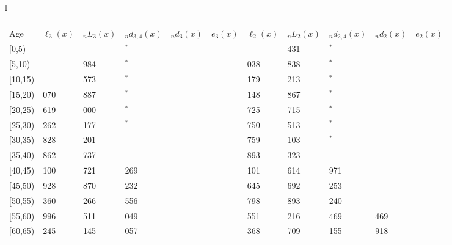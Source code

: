 \documentclass[
]{article}
\begin{document}
\begin{table}
\begin{tabular}[t]{l}
\end{tabular}
\centering
\begin{tabular}[t]{l}
\hline
\begin{tabular}{>{\raggedright\arraybackslash}p{.43in}>{\raggedleft\arraybackslash}p{.42in}>{\raggedleft\arraybackslash}p{.42in}>{\raggedleft\arraybackslash}p{.42in}>{\raggedleft\arraybackslash}p{.42in}>{\raggedleft\arraybackslash}p{.42in}>{\raggedleft\arraybackslash}p{.42in}>{\raggedleft\arraybackslash}p{.42in}>{\raggedleft\arraybackslash}p{.42in}>{\raggedleft\arraybackslash}p{.42in}>{\raggedleft\arraybackslash}p{.42in}}
\toprule
\multicolumn{1}{c}{ } & \multicolumn{5}{c}{(2) Lost mother only} & \multicolumn{5}{c}{(3) Lost father only} \\
\cmidrule(l{3pt}r{3pt}){2-6} \cmidrule(l{3pt}r{3pt}){7-11}
Age & $\ell_{3}(x)$ & ${}_nL_{3}(x)$ & ${}_nd_{3,4}(x)$ & ${}_nd_{3}(x)$ & $e_{3}(x)$ & $\ell_{2}(x)$ & ${}_nL_{2}(x)$ & ${}_nd_{2,4}(x)$ & ${}_nd_{2}(x)$ & $e_{2}(x)$\\
\midrule
{}[0,5) & 0 & 336 & 0$^{*}$ & 0 & 4 & 0 & 2 431 & 0$^{*}$ & 3 & 10\\
{}[5,10) & 199 & 1 984 & 42$^{*}$ & 0 & 4 & 1 038 & 7 838 & 26$^{*}$ & 1 & 10\\
{}[10,15) & 631 & 4 573 & 0$^{*}$ & 1 & 4 & 2 179 & 14 213 & 61$^{*}$ & 2 & 10\\
{}[15,20) & 1 070 & 6 887 & 255$^{*}$ & 5 & 4 & 3 148 & 21 867 & 64$^{*}$ & 16 & 10\\
{}[20,25) & 1 619 & 10 000 & 284$^{*}$ & 14 & 4 & 4 725 & 32 715 & 174$^{*}$ & 47 & 10\\
\addlinespace
{}[25,30) & 2 262 & 15 177 & 170$^{*}$ & 28 & 3 & 6 750 & 44 513 & 411$^{*}$ & 81 & 10\\
{}[30,35) & 3 828 & 24 201 & 565 & 50 & 3 & 8 759 & 58 103 & 431$^{*}$ & 119 & 9\\
{}[35,40) & 4 862 & 33 737 & 826 & 87 & 3 & 10 893 & 75 323 & 647 & 194 & 9\\
{}[40,45) & 6 100 & 40 721 & 1 269 & 134 & 3 & 15 101 & 103 614 & 1 971 & 341 & 8\\
{}[45,50) & 6 928 & 44 870 & 2 232 & 204 & 2 & 18 645 & 122 692 & 3 253 & 558 & 7\\
\addlinespace
{}[50,55) & 7 360 & 47 266 & 3 556 & 321 & 2 & 21 798 & 137 893 & 6 240 & 937 & 6\\
{}[55,60) & 6 996 & 45 511 & 4 049 & 487 & 2 & 20 551 & 137 216 & 4 469 & 1 469 & 5\\
{}[60,65) & 5 245 & 39 145 & 5 057 & 617 & 1 & 21 368 & 121 709 & 10 155 & 1 918 & 3\\

\end{tabular}
\end{tabular}
\end{table}
\end{document}
